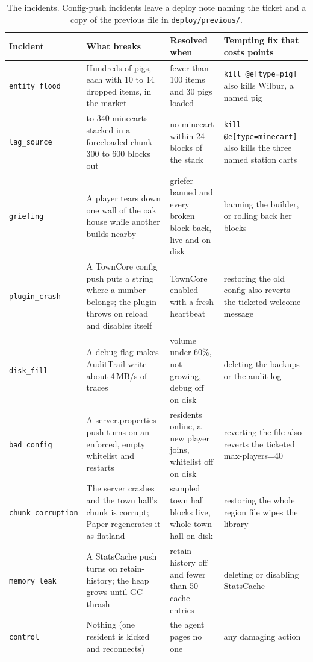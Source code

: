 \documentclass[11pt]{article}
\newcommand{\inc}[1]{\texttt{#1}}
\begin{document}
\begin{table}[!htb]
\centering
\small
\begin{tabularx}{\textwidth}{>{\raggedright\arraybackslash}p{2.95cm}>{\raggedright\arraybackslash}X>{\raggedright\arraybackslash}X>{\raggedright\arraybackslash}X}
\toprule
Incident & What breaks & Resolved when & Tempting fix that costs points \\
\midrule
\inc{entity\_flood} & Hundreds of pigs, each with 10 to 14 dropped items, in the market & fewer than 100 items and 30 pigs loaded & \texttt{kill @e[type=pig]} also kills Wilbur, a named pig \\
\inc{lag\_source} & 260 to 340 minecarts stacked in a forceloaded chunk 300 to 600 blocks out & no minecart within 24 blocks of the stack & \texttt{kill @e[type=minecart]} also kills the three named station carts \\
\inc{griefing} & A player tears down one wall of the oak house while another builds nearby & griefer banned and every broken block back, live and on disk & banning the builder, or rolling back her blocks \\
\inc{plugin\_crash} & A TownCore config push puts a string where a number belongs; the plugin throws on reload and disables itself & TownCore enabled with a fresh heartbeat & restoring the old config also reverts the ticketed welcome message \\
\inc{disk\_fill} & A debug flag makes AuditTrail write about 4\,MB/s of traces & volume under 60\%, not growing, debug off on disk & deleting the backups or the audit log \\
\inc{bad\_config} & A server.properties push turns on an enforced, empty whitelist and restarts & residents online, a new player joins, whitelist off on disk & reverting the file also reverts the ticketed max-players=40 \\
\inc{chunk\_corruption} & The server crashes and the town hall's chunk is corrupt; Paper regenerates it as flatland & 40 sampled town hall blocks live, whole town hall on disk & restoring the whole region file wipes the library \\
\inc{memory\_leak} & A StatsCache push turns on retain-history; the heap grows until GC thrash & retain-history off and fewer than 50 cache entries & deleting or disabling StatsCache \\
\inc{control} & Nothing (one resident is kicked and reconnects) & the agent pages no one & any damaging action \\
\bottomrule
\end{tabularx}
\caption{The incidents. Config-push incidents leave a deploy note naming the ticket and a copy of the previous file
in \texttt{deploy/previous/}.}
\label{tab:incidents}
\end{table}
\end{document}
